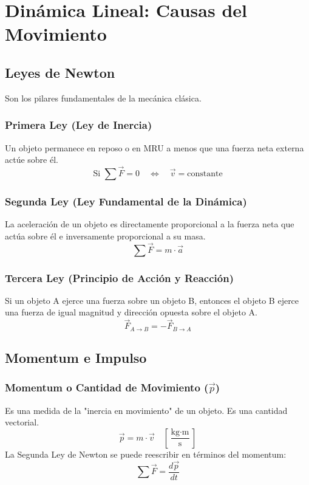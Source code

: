 \documentclass[11pt]{article}
\begin{document}
\newpage

\section{Dinámica Lineal: Causas del Movimiento}
\label{sec:dinamica_lineal}

\subsection{Leyes de Newton}
Son los pilares fundamentales de la mecánica clásica.

\subsubsection{Primera Ley (Ley de Inercia)}
Un objeto permanece en reposo o en MRU a menos que una fuerza neta externa actúe sobre él.
\[ \text{Si } \sum \vec{F} = 0 \quad \iff \quad \vec{v} = \text{constante} \]

\subsubsection{Segunda Ley (Ley Fundamental de la Dinámica)}
La aceleración de un objeto es directamente proporcional a la fuerza neta que actúa sobre él e inversamente proporcional a su masa.
\[ \sum \vec{F} = m \cdot \vec{a} \]

\subsubsection{Tercera Ley (Principio de Acción y Reacción)}
Si un objeto A ejerce una fuerza sobre un objeto B, entonces el objeto B ejerce una fuerza de igual magnitud y dirección opuesta sobre el objeto A.
\[ \vec{F}_{A \to B} = - \vec{F}_{B \to A} \]

\subsection{Momentum e Impulso}

\subsubsection{Momentum o Cantidad de Movimiento ($\vec{p}$)}
Es una medida de la "inercia en movimiento" de un objeto. Es una cantidad vectorial.
\[ \vec{p} = m \cdot \vec{v} \quad \left[\frac{\text{kg} \cdot \text{m}}{\text{s}}\right] \]
La Segunda Ley de Newton se puede reescribir en términos del momentum:
\[ \sum \vec{F} = \frac{d\vec{p}}{dt} \]
\end{document}
